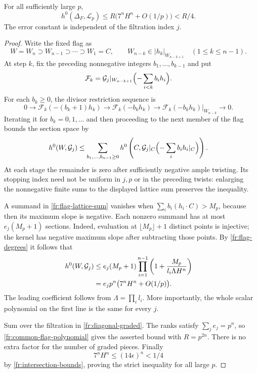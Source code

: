 \begin{lemma}\label{fr:diagonal-sections}
For all sufficiently large $p$,
\[
 h^0(\Delta_F,\mathcal L_p)
 \le R\bigl(7^nH^n+O(1/p)\bigr)<R/4.
\]
The error constant is independent of the filtration index $j$.
\end{lemma}

\begin{proof}
Write the fixed flag as
\[
 W=W_n\supset W_{n-1}\supset\cdots\supset W_1=C,
 \qquad W_{n-k}\in|h_k|_{W_{n-k+1}}
 \quad(1\le k\le n-1).
\]
At step $k$, fix the preceding nonnegative integers
$b_1,\ldots,b_{k-1}$ and put
\[
 \mathcal F_k=
 \mathcal G_j|_{W_{n-k+1}}
 \Bigl(-\sum_{i<k}b_i h_i\Bigr).
\]
For each $b_k\ge0$, the divisor restriction sequence is
\[
 0\longrightarrow\mathcal F_k(-(b_k+1)h_k)
 \longrightarrow\mathcal F_k(-b_kh_k)
 \longrightarrow
 \mathcal F_k(-b_kh_k)|_{W_{n-k}}
 \longrightarrow0.
\]
Iterating it for $b_k=0,1,\ldots$ and then proceeding to the next
member of the flag bounds the section space by
\begin{equation}\label{fr:flag-lattice-sum}
 h^0(W,\mathcal G_j)\le
 \sum_{b_1,\ldots,b_{n-1}\ge0}
 h^0\left(C,\mathcal G_j|_C\Bigl(-\sum_i b_i h_i|_C\Bigr)\right).
\end{equation}
At each stage the remainder is zero after sufficiently negative
ample twisting.  Its stopping index need not be uniform in $j,p$
or in the preceding twists: enlarging the nonnegative finite sums
to the displayed lattice sum preserves the inequality.

A summand in \eqref{fr:flag-lattice-sum} vanishes when
$\sum_i b_i(h_i\cdot C)>M_p$, because then its maximum slope is
negative.  Each nonzero summand has at most $e_j(M_p+1)$ sections.
Indeed, evaluation at $\lfloor M_p\rfloor+1$ distinct points is injective;
the kernel has negative maximum slope after subtracting those
points.  By \eqref{fr:flag-degrees} it follows that
\begin{align}
 h^0(W,\mathcal G_j)
 &\le e_j(M_p+1)
       \prod_{i=1}^{n-1}
       \left(1+\frac{M_p}{l_i\Lambda H^n}\right)\notag\\
 &=e_jp^n\bigl(7^nH^n+O(1/p)\bigr).
 \label{fr:common-flag-polynomial}
\end{align}
The leading coefficient follows from
$\Lambda=\prod_i l_i$.  More importantly, the whole scalar
polynomial on the first line is the same for every $j$.

Sum over the filtration in \eqref{fr:diagonal-graded}.  The ranks
satisfy $\sum_j e_j=p^n$, so \eqref{fr:common-flag-polynomial} gives
the asserted bound with $R=p^{2n}$.  There is no extra factor for
the number of graded pieces.  Finally
\[
 7^nH^n\le(14\epsilon)^n<1/4
\]
by \eqref{fr:intersection-bounds}, proving the strict inequality
for all large $p$.
\end{proof}

